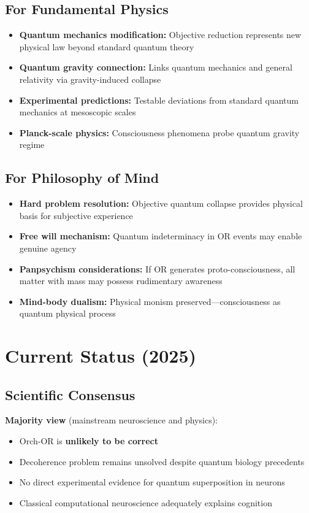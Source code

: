 \subsection{For Fundamental Physics}

\begin{itemize}
\item \textbf{Quantum mechanics modification:} Objective reduction represents new physical law beyond standard quantum theory
\item \textbf{Quantum gravity connection:} Links quantum mechanics and general relativity via gravity-induced collapse
\item \textbf{Experimental predictions:} Testable deviations from standard quantum mechanics at mesoscopic scales
\item \textbf{Planck-scale physics:} Consciousness phenomena probe quantum gravity regime
\end{itemize}

\subsection{For Philosophy of Mind}

\begin{itemize}
\item \textbf{Hard problem resolution:} Objective quantum collapse provides physical basis for subjective experience
\item \textbf{Free will mechanism:} Quantum indeterminacy in OR events may enable genuine agency
\item \textbf{Panpsychism considerations:} If OR generates proto-consciousness, all matter with mass may possess rudimentary awareness
\item \textbf{Mind-body dualism:} Physical monism preserved---consciousness as quantum physical process
\end{itemize}

\section{Current Status (2025)}

\subsection{Scientific Consensus}

\textbf{Majority view} (mainstream neuroscience and physics):
\begin{itemize}
\item Orch-OR is \textbf{unlikely to be correct}
\item Decoherence problem remains unsolved despite quantum biology precedents
\item No direct experimental evidence for quantum superposition in neurons
\item Classical computational neuroscience adequately explains cognition
\end{itemize}

